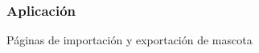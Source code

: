 \documentclass[14pt]{beamer}
\begin{document}
\begin{frame}
\frametitle{Aplicación}
Páginas de importación y exportación de mascota
\begin{columns}
\begin{column}{0.25\textwidth}
\begin{center}



\end{center}
\end{column}
\end{columns}
\end{frame}
\end{document}
